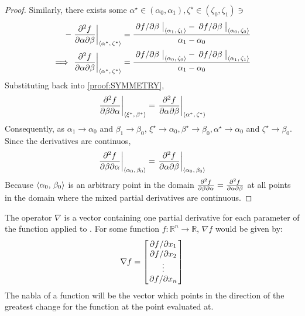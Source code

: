 \begin{lemma}
\begin{proof}
		Similarly, there exists some $\alpha^\star\in(\alpha_0,\alpha_1),\zeta^\star\in(\zeta_0,\zeta_1)\ni$
		\begin{align*}
			-\eval{\pdv{f}{\alpha}{\beta}}_{\point{\alpha^\star}{\zeta^\star}}&=\frac{\eval{\pdv*{f}{\beta}}_{\point{\alpha_1}{\zeta_1}}-\eval{\pdv*{f}{\beta}}_{\point{\alpha_0}{\zeta_0}}}{\alpha_1-\alpha_0}\\
			\implies\eval{\pdv{f}{\alpha}{\beta}}_{\point{\alpha^\star}{\zeta^\star}}&=\frac{\eval{\pdv*{f}{\beta}}_{\point{\alpha_0}{\zeta_0}}-\eval{\pdv*{f}{\beta}}_{\point{\alpha_1}{\zeta_1}}}{\alpha_1-\alpha_0}
		\end{align*}
		Substituting back into \eqref{proof:SYMMETRY},
		$$
			\eval{\pdv{f}{\beta}{\alpha}}_{\point{\xi^\star}{\beta^\star}}=\eval{\pdv{f}{\alpha}{\beta}}_{\point{\alpha^\star}{\zeta^\star}}
		$$
		Consequently, as $\alpha_1\rightarrow\alpha_0$ and $\beta_1\rightarrow\beta_0$, $\xi^\star\rightarrow\alpha_0,\beta^\star\rightarrow\beta_0,\alpha^\star\rightarrow\alpha_0$ 
		and $\zeta^\star\rightarrow\beta_0$. Since the derivatives are continuos,
		$$
			\eval{\pdv{f}{\beta}{\alpha}}_{\point{\alpha_0}{\beta_0}}=\eval{\pdv{f}{\alpha}{\beta}}_{\point{\alpha_0}{\beta_0}}
		$$
		Because $\langle\alpha_0,\,\beta_0\rangle$ is an arbitrary point in the domain $\pdv{f}{\beta}{\alpha}=\pdv{f}{\alpha}{\beta}$ at 
		all points in the domain where the mixed partial derivatives are continuous.
	\end{proof}
\end{lemma}
\begin{defn}
	The  operator $\nabla$ is a vector containing one partial derivative for each parameter of
	the function applied to \cite{RAPP2017137}. For some function $f:\mathbb{R}^n\rightarrow\mathbb{R}$, $\nabla f$ would be given by:
	$$
	\nabla f=\begin{bmatrix}
		\pdv*{f}{x_1}\\
		\pdv*{f}{x_2}\\
		\vdots\\
		\pdv*{f}{x_n}
	\end{bmatrix}
	$$
	The nabla of a function will be the vector which points in the direction of the greatest change for the function
	at the point evaluated at.
\end{defn}

